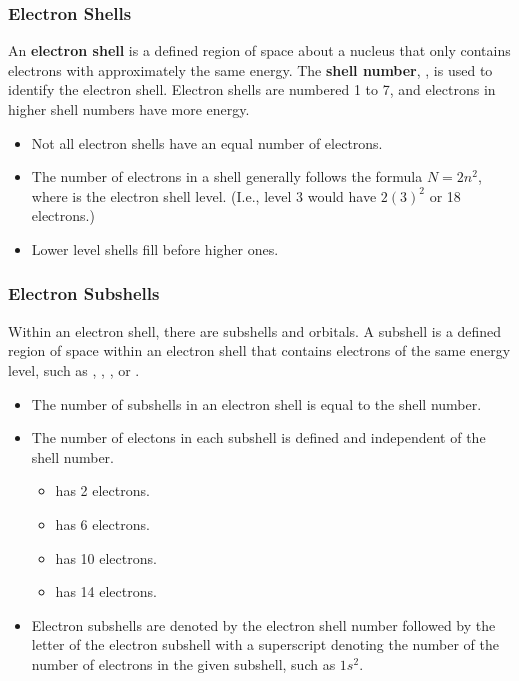 \subsubsection{Electron Shells}

\begin{defn}
An \textbf{electron shell} is a defined region of space about a nucleus that only contains electrons with approximately the same energy. The \textbf{shell number}, , is used to identify the electron shell. Electron shells are numbered 1 to 7, and electrons in higher shell numbers have more energy.
\end{defn}

\begin{itemize}
\item Not all electron shells have an equal number of electrons.
\item The number of electrons in a shell generally follows the formula $N = 2n^{2}$, where  is the electron shell level. (I.e., level 3 would have $2(3)^{2}$ or 18 electrons.) 
\item Lower level shells fill before higher ones.
\end{itemize}

\subsubsection{Electron Subshells}

Within an electron shell, there are subshells and orbitals. A subshell is a defined region of space within an electron shell that contains electrons of the same energy level, such as , , , or .

\begin{itemize}
\item The number of subshells in an electron shell is equal to the shell number.
\item The number of electons in each subshell is defined and independent of the shell number.
\begin{multicols}{2}
	\begin{itemize}
	\item {} has 2 electrons.
	\item {} has 6 electrons.
	\item {} has 10 electrons.
	\item {} has 14 electrons.
	\end{itemize}
\end{multicols}
\item Electron subshells are denoted by the electron shell number followed by the letter of the electron subshell with a superscript denoting the number of the number of electrons in the given subshell, such as $1s^{2}$.
\end{itemize}

